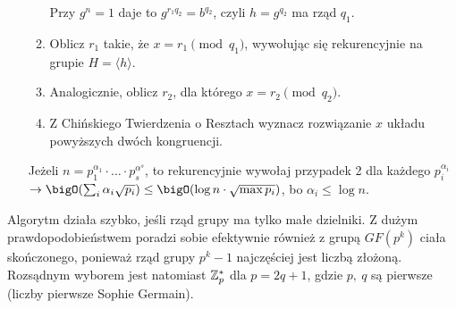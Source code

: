 \begin{greyframe}
\begin{enumerate}[I]
\begin{enumerate}
\[            \]
            Przy \( g^n = 1 \) daje to \( g^{r_1 q_2} = b^{q_2} \), czyli \( h = g^{q_2} \) ma rząd \( q_1 \).
            \item Oblicz \( r_1 \) takie, że \( x = r_1 \pmod{q_1} \), wywołując się rekurencyjnie na grupie \( H = \langle h \rangle \).
            \item Analogicznie, oblicz \( r_2 \), dla którego \( x = r_2 \pmod{q_2} \).
            \item Z Chińskiego Twierdzenia o Resztach wyznacz rozwiązanie \( x \) układu powyższych dwóch kongruencji.
        \end{enumerate}
        Jeżeli \( n = p_1^{\alpha_1} \cdot \ldots \cdot p_s^{\alpha^s} \), to rekurencyjnie wywołaj przypadek 2 dla każdego \( p_i^{\alpha_i} \) \( \rightarrow \bigO(\sum_i \alpha_i \sqrt{p_i}) \leq \bigO(\log n \cdot \sqrt{\max{p_i}}) \), bo \( \alpha_i \leq \log n \).
    \end{enumerate}
\end{greyframe}

Algorytm działa szybko, jeśli rząd grupy ma tylko małe dzielniki. Z dużym prawdopodobieństwem poradzi sobie efektywnie również z grupą \( GF(p^k) \) ciała skończonego, ponieważ rząd grupy \( p^k - 1 \) najczęściej jest liczbą złożoną.
Rozsądnym wyborem jest natomiast \( \mathbb{Z}^{*}_p \) dla \( p = 2q + 1 \), gdzie \( p, \ q \) są pierwsze (liczby pierwsze Sophie Germain).
